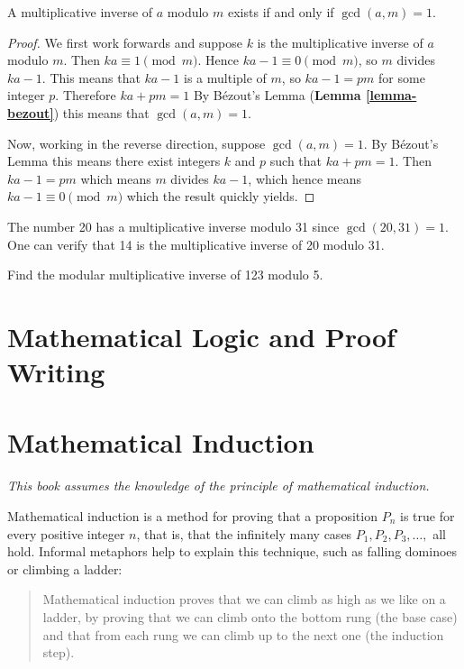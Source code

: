 \begin{proposition}\label{prop-multiplicative-inverse-exists-iff-coprime}
    A multiplicative inverse of $a$ modulo $m$ exists if and only if $\gcd(a,m) = 1$.
\end{proposition}
\begin{proof}
    We first work forwards and suppose $k$ is the multiplicative inverse of $a$ modulo $m$. Then $ka \equiv 1 \pmod m$. Hence $ka - 1 \equiv 0 \pmod m$, so $m$ divides $ka - 1$. This means that $ka - 1$ is a multiple of $m$, so $ka - 1 = pm$ for some integer $p$. Therefore $ka + pm = 1$ By B\'{e}zout's Lemma (\textbf{Lemma \ref{lemma-bezout}}) this means that $\gcd(a, m) = 1$.
    
    Now, working in the reverse direction, suppose $\gcd(a, m) = 1$. By B\'{e}zout's Lemma this means there exist integers $k$ and $p$ such that $ka + pm = 1$. Then $ka - 1 = pm$ which means $m$ divides $ka - 1$, which hence means $ka - 1 \equiv 0 \pmod m$ which the result quickly yields.
\end{proof}

\begin{example}
    The number 20 has a multiplicative inverse modulo 31 since $\gcd(20, 31) = 1$. One can verify that 14 is the multiplicative inverse of 20 modulo 31.
\end{example}

\begin{exercise}
    Find the modular multiplicative inverse of 123 modulo 5.
\end{exercise}

\chapter{Mathematical Logic and Proof Writing}

\chapter{Mathematical Induction}
\textit{This book assumes the knowledge of the principle of mathematical induction.}

Mathematical induction is a method for proving that a proposition $P_n$ is true for every positive integer $n$, that is, that the infinitely many cases $P_1, P_2, P_3, \dots,$ all hold. Informal metaphors help to explain this technique, such as falling dominoes or climbing a ladder:
\begin{quote}
    Mathematical induction proves that we can climb as high as we like on a ladder, by proving that we can climb onto the bottom rung (the base case) and that from each rung we can climb up to the next one (the induction step).
\end{quote}

